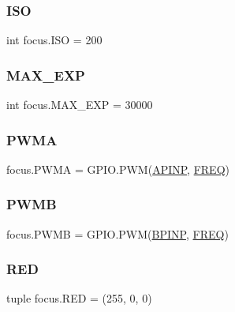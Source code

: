 \mbox{\label{namespacefocus_ac7e622de99a123967bedbb1f5927ac40}} 
\subsubsection{\texorpdfstring{I\+SO}{ISO}}
{\footnotesize\ttfamily int focus.\+I\+SO = 200}

\mbox{\label{namespacefocus_a3c4a2866356f68ceb6834b38951c16a0}} 
\subsubsection{\texorpdfstring{M\+A\+X\+\_\+\+E\+XP}{MAX\_EXP}}
{\footnotesize\ttfamily int focus.\+M\+A\+X\+\_\+\+E\+XP = 30000}

\mbox{\label{namespacefocus_a2418021a7b6b394da695928f0d8cd16b}} 
\subsubsection{\texorpdfstring{P\+W\+MA}{PWMA}}
{\footnotesize\ttfamily focus.\+P\+W\+MA = G\+P\+I\+O.\+P\+WM(\hyperlink{namespacefocus_a358eaeffe0790a67619dfd820f2d66b5}{A\+P\+I\+NP}, \hyperlink{namespacefocus_a9f8a2660e7de2a492738e587878c2b7a}{F\+R\+EQ})}

\mbox{\label{namespacefocus_a9e16a63e33dd8dd160996df16dacb633}} 
\subsubsection{\texorpdfstring{P\+W\+MB}{PWMB}}
{\footnotesize\ttfamily focus.\+P\+W\+MB = G\+P\+I\+O.\+P\+WM(\hyperlink{namespacefocus_a88336729338c9d4ef54e14f02f406c1b}{B\+P\+I\+NP}, \hyperlink{namespacefocus_a9f8a2660e7de2a492738e587878c2b7a}{F\+R\+EQ})}

\mbox{\label{namespacefocus_acc5e8b5ab47d18ad8776c429e3a3a4b7}} 
\subsubsection{\texorpdfstring{R\+ED}{RED}}
{\footnotesize\ttfamily tuple focus.\+R\+ED = (255, 0, 0)}

